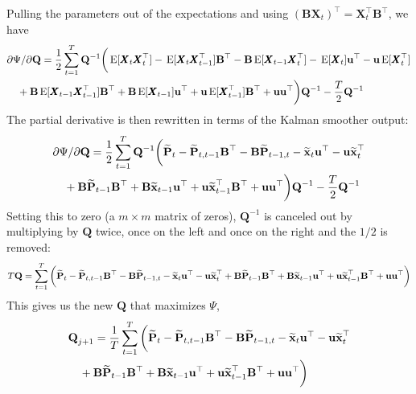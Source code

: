 \documentclass[]{article}
\def\UPS{\mbox{\boldmath $\Upsilon$}}
\def\BB{\mbox{$\mathbf B$}}	\def\bb{\mbox{$\mathbf b$}} \def\Bb{\mbox{$\mathbf J$}} \def\Ba{\mbox{$\mathbf L$}} \def\Bm{\UPS}
\def\E{\,\textup{\textrm{E}}}
\def\PP{\mbox{$\mathbf P$}}  \def\pp{\mbox{$\mathbf p$}}
\def\QQ{\mbox{$\mathbf Q$}}	 \def\qq{\mbox{$\mathbf q$}} \def\Qb{\mbox{$\mathbf G$}}  \def\Qm{\mathbb{Q}}
\def\XX{\mbox{$\pmb{X}$}}	\def\xx{\mbox{$\pmb{x}$}}
\def\hatxt{\widetilde{\mbox{$\mathbf x$}}_t}
\def\hatxtm{\widetilde{\mbox{$\mathbf x$}}_{t-1}}
\def\hatPt{\widetilde{\PP}_t}
\def\hatPtm{\widetilde{\PP}_{t-1}}
\def\hatPttm{\widetilde{\PP}_{t,t-1}}
\def\hatPtmt{\widetilde{\PP}_{t-1,t}}
\begin{document}
Pulling the parameters out of the expectations and using $(\BB\XX_t)^\top = \XX_t^\top\BB^\top$, we have
\begin{equation}\label{eq:Q.unconstrained3}
\begin{split}
&\partial\Psi/\partial\QQ = \frac{1}{2} \sum_{t=1}^T \QQ^{-1} \bigg( 
 \E[\XX_t\XX_t^\top] -\E[\XX_t\XX_{t-1}^\top ]\BB^\top - \BB\E[\XX_{t-1}\XX_t^\top ] - \E[ \XX_t ]\uu^\top - \uu \E[ \XX_t^\top ]\\
&\quad + \BB\E[ \XX_{t-1}\XX_{t-1}^\top ]\BB^\top + \BB\E[\XX_{t-1}]\uu^\top  + \uu\E[\XX_{t-1}^\top ]\BB^\top + \uu\uu^\top \bigg)\QQ^{-1} - \frac{T}{2}\QQ^{-1} 
\end{split}
\end{equation}
The partial derivative is then rewritten in terms of the Kalman smoother output:
\begin{equation}\label{eq:Q.unconstrained4}
\begin{split}
&\partial\Psi/\partial\QQ = \frac{1}{2} \sum_{t=1}^T \QQ^{-1} \bigg(  
 \hatPt - \hatPttm \BB^\top - \BB\hatPtmt 
- \hatxt\uu^\top - \uu \hatxt^\top \\
&\quad + \BB\hatPtm\BB^\top + \BB\hatxtm\uu^\top + \uu\hatxtm^\top\BB^\top + \uu\uu^\top \bigg)\QQ^{-1} - \frac{T}{2}\QQ^{-1} 
\end{split}
\end{equation}
Setting this to zero (a $m \times m$ matrix of zeros), $\QQ^{-1}$ is canceled out by multiplying by $\QQ$ twice, once on the left and once on the right and the $1/2$ is removed: 
\begin{equation}\label{eq:Q.unconstrained5}
\begin{split}
T\QQ = \sum_{t=1}^T \bigg(  
 \hatPt - \hatPttm \BB^\top - \BB\hatPtmt 
 - \hatxt\uu^\top - \uu \hatxt^\top 
 + \BB\hatPtm\BB^\top + \BB\hatxtm\uu^\top + \uu\hatxtm^\top\BB^\top 
 + \uu\uu^\top \bigg) 
\end{split}
\end{equation}
This gives us the new $\QQ$ that maximizes $\Psi$, 
\begin{equation}\label{eq:Q.update.unconstrained}
\begin{split}
&\QQ_{j+1} = \frac{1}{T}\sum_{t=1}^T \bigg( 
\hatPt - \hatPttm \BB^\top - \BB\hatPtmt 
 - \hatxt\uu^\top - \uu \hatxt^\top \\
&\quad + \BB\hatPtm\BB^\top + \BB\hatxtm\uu^\top + \uu\hatxtm^\top\BB^\top 
 + \uu\uu^\top \bigg)
\end{split}
\end{equation}
\end{document}
